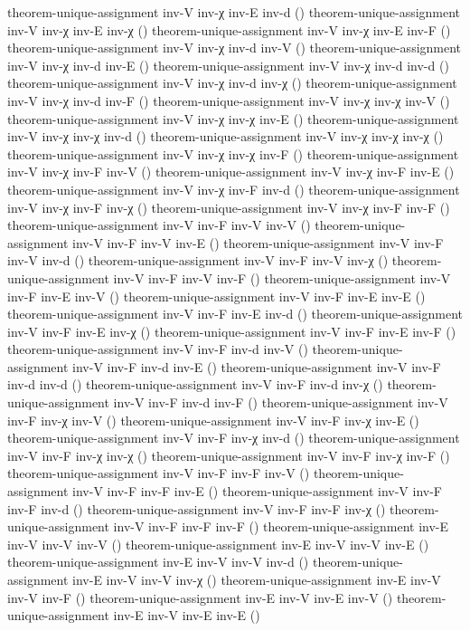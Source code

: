 \documentclass[11pt,a4paper]{article}
\begin{document}
\begin{code}
theorem-unique-assignment inv-V inv-χ inv-E inv-d ()
theorem-unique-assignment inv-V inv-χ inv-E inv-χ ()
theorem-unique-assignment inv-V inv-χ inv-E inv-F ()
theorem-unique-assignment inv-V inv-χ inv-d inv-V ()
theorem-unique-assignment inv-V inv-χ inv-d inv-E ()
theorem-unique-assignment inv-V inv-χ inv-d inv-d ()
theorem-unique-assignment inv-V inv-χ inv-d inv-χ ()
theorem-unique-assignment inv-V inv-χ inv-d inv-F ()
theorem-unique-assignment inv-V inv-χ inv-χ inv-V ()
theorem-unique-assignment inv-V inv-χ inv-χ inv-E ()
theorem-unique-assignment inv-V inv-χ inv-χ inv-d ()
theorem-unique-assignment inv-V inv-χ inv-χ inv-χ ()
theorem-unique-assignment inv-V inv-χ inv-χ inv-F ()
theorem-unique-assignment inv-V inv-χ inv-F inv-V ()
theorem-unique-assignment inv-V inv-χ inv-F inv-E ()
theorem-unique-assignment inv-V inv-χ inv-F inv-d ()
theorem-unique-assignment inv-V inv-χ inv-F inv-χ ()
theorem-unique-assignment inv-V inv-χ inv-F inv-F ()
theorem-unique-assignment inv-V inv-F inv-V inv-V ()
theorem-unique-assignment inv-V inv-F inv-V inv-E ()
theorem-unique-assignment inv-V inv-F inv-V inv-d ()
theorem-unique-assignment inv-V inv-F inv-V inv-χ ()
theorem-unique-assignment inv-V inv-F inv-V inv-F ()
theorem-unique-assignment inv-V inv-F inv-E inv-V ()
theorem-unique-assignment inv-V inv-F inv-E inv-E ()
theorem-unique-assignment inv-V inv-F inv-E inv-d ()
theorem-unique-assignment inv-V inv-F inv-E inv-χ ()
theorem-unique-assignment inv-V inv-F inv-E inv-F ()
theorem-unique-assignment inv-V inv-F inv-d inv-V ()
theorem-unique-assignment inv-V inv-F inv-d inv-E ()
theorem-unique-assignment inv-V inv-F inv-d inv-d ()
theorem-unique-assignment inv-V inv-F inv-d inv-χ ()
theorem-unique-assignment inv-V inv-F inv-d inv-F ()
theorem-unique-assignment inv-V inv-F inv-χ inv-V ()
theorem-unique-assignment inv-V inv-F inv-χ inv-E ()
theorem-unique-assignment inv-V inv-F inv-χ inv-d ()
theorem-unique-assignment inv-V inv-F inv-χ inv-χ ()
theorem-unique-assignment inv-V inv-F inv-χ inv-F ()
theorem-unique-assignment inv-V inv-F inv-F inv-V ()
theorem-unique-assignment inv-V inv-F inv-F inv-E ()
theorem-unique-assignment inv-V inv-F inv-F inv-d ()
theorem-unique-assignment inv-V inv-F inv-F inv-χ ()
theorem-unique-assignment inv-V inv-F inv-F inv-F ()
theorem-unique-assignment inv-E inv-V inv-V inv-V ()
theorem-unique-assignment inv-E inv-V inv-V inv-E ()
theorem-unique-assignment inv-E inv-V inv-V inv-d ()
theorem-unique-assignment inv-E inv-V inv-V inv-χ ()
theorem-unique-assignment inv-E inv-V inv-V inv-F ()
theorem-unique-assignment inv-E inv-V inv-E inv-V ()
theorem-unique-assignment inv-E inv-V inv-E inv-E ()

\end{code}
\end{document}
